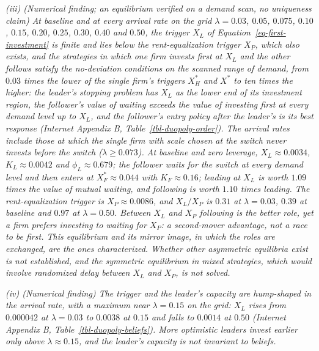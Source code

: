 \documentclass[
  11pt,
  letterpaper,
]{scrartcl}
\begin{document}
\emph{(iii) (Numerical finding; an equilibrium verified on a demand
scan, no uniqueness claim) At baseline and at every arrival rate on the
grid \(\lambda = 0.03\), \(0.05\), \(0.075\), \(0.10\), \(0.15\),
\(0.20\), \(0.25\), \(0.30\), \(0.40\) and \(0.50\), the trigger \(X_L\)
of Equation~\ref{eq-first-investment} is finite and lies below the
rent-equalization trigger \(X_P\), which also exists, and the strategies
in which one firm invests first at \(X_L\) and the other follows satisfy
the no-deviation conditions on the scanned range of demand, from
\(0.03\) times the lower of the single firm's triggers \(X_H^*\) and
\(X^*\) to ten times the higher: the leader's stopping problem has
\(X_L\) as the lower end of its investment region, the follower's value
of waiting exceeds the value of investing first at every demand level up
to \(X_L\), and the follower's entry policy after the leader's is its
best response (Internet Appendix B, Table~\ref{tbl-duopoly-order}). The
arrival rates include those at which the single firm with scale chosen
at the switch never invests before the switch (\(\lambda \geq 0.073\)).
At baseline and zero leverage, \(X_L \approx 0.0034\),
\(K_L \approx 0.0042\) and \(\phi_L \approx 0.679\); the follower waits
for the switch at every demand level and then enters at
\(X_F^* \approx 0.044\) with \(K_F \approx 0.16\); leading at \(X_L\) is
worth \(1.09\) times the value of mutual waiting, and following is worth
\(1.10\) times leading. The rent-equalization trigger is
\(X_P \approx 0.0086\), and \(X_L/X_P\) is \(0.31\) at
\(\lambda = 0.03\), \(0.39\) at baseline and \(0.97\) at
\(\lambda = 0.50\). Between \(X_L\) and \(X_P\) following is the better
role, yet a firm prefers investing to waiting for \(X_P\): a
second-mover advantage, not a race to be first. This equilibrium and its
mirror image, in which the roles are exchanged, are the ones
characterized. Whether other asymmetric equilibria exist is not
established, and the symmetric equilibrium in mixed strategies, which
would involve randomized delay between \(X_L\) and \(X_P\), is not
solved.}

\emph{(iv) (Numerical finding) The trigger and the leader's capacity are
hump-shaped in the arrival rate, with a maximum near \(\lambda = 0.15\)
on the grid: \(X_L\) rises from \(0.000042\) at \(\lambda = 0.03\) to
\(0.0038\) at \(0.15\) and falls to \(0.0014\) at \(0.50\) (Internet
Appendix B, Table~\ref{tbl-duopoly-beliefs}). More optimistic leaders
invest earlier only above \(\lambda \approx 0.15\), and the leader's
capacity is not invariant to beliefs.}
\end{document}
